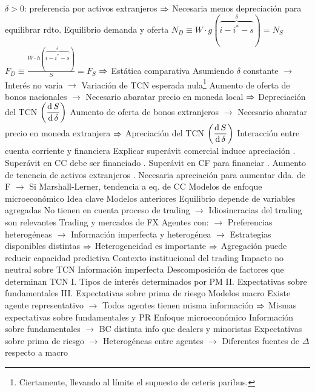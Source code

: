 \documentclass{nuevotema}
\begin{document}
\begin{esquemal}
				\4[] $\delta > 0$: preferencia por activos extranjeros
				\4[] $\Rightarrow$ Necesaria menos depreciación para equilibrar rdto.
				\4 Equilibrio demanda y oferta
				\4[] $N_D \equiv W\cdot g(\overbrace{i - i^* - \dot{s}}^{\delta}) = N_S$
				\4[] $F_D \equiv \frac{W\cdot h(\overbrace{i -i^* -\dot{s}}^\delta)}{S} = F_S$
				\4[] $\Rightarrow$ 
				\4 Estática comparativa
				\4[] Asumiendo $\delta$ constante
				\4[] $\to$ Interés no varía
				\4[] $\to$ Variación de TCN esperada nula\footnote{Ciertamente, llevando al límite el supuesto de ceteris paribus.}
				\4[] Aumento de oferta de bonos nacionales
				\4[] $\to$ Necesario abaratar precio en moneda local
				\4[] $\Rightarrow$ Depreciación del TCN $ \left( \dfrac{\text{d} \, S}{\text{d} \, \delta} \right)$
				\4[] Aumento de oferta de bonos extranjeros
				\4[] $\to$ Necesario abaratar precio en moneda extranjera
				\4[] $\Rightarrow$ Apreciación del TCN $\left( \dfrac{\text{d} \, S}{\text{d} \, \delta} \right)$
				\4 Interacción entre cuenta corriente y financiera
				\4[] Explicar superávit comercial induce apreciación
				. Superávit en CC debe ser financiado
				. Superávit en CF para financiar
				. Aumento de tenencia de activos extranjeros
				. Necesaria apreciación para aumentar dda. de F
				\4[] $\to$ Si Marshall-Lerner, tendencia a eq. de CC
		\2 Modelos de enfoque microeconómico
			\3 Idea clave
				\4 Modelos anteriores
				\4[] Equilibrio depende de variables agregadas
				\4[] No tienen en cuenta proceso de trading
				\4[] $\to$ Idiosincracias del trading son relevantes
				\4 Trading y mercados de FX
				\4[] Agentes con:
				\4[] $\to$ Preferencias heterogéneas
				\4[] $\to$ Información imperfecta y heterogénea
				\4[] $\to$ Estrategias disponibles distintas
				\4[] $\Rightarrow$ Heterogeneidad es importante
				\4[] $\Rightarrow$ Agregación puede reducir capacidad predictiva
				\4 Contexto institucional del trading
				\4[] Impacto no neutral sobre TCN
			\3 Información imperfecta
				\4 Descomposición de factores que determinan TCN
				\4[] I. Tipos de interés determinados por PM
				\4[] II. Expectativas sobre fundamentales
				\4[] III. Expectativas sobre prima de riesgo
				\4 Modelos macro
				\4[] Existe agente representativo
				\4[] $\to$ Todos agentes tienen misma información
				\4[] $\Rightarrow$ Mismas expectativas sobre fundamentales y PR
				\4 Enfoque microeconómico
				\4[] Información sobre fundamentales
				\4[] $\to$ BC distinta info que dealers y minoristas
				\4[] Expectativas sobre prima de riesgo
				\4[] $\to$ Heterogéneas entre agentes
				\4[] $\to$ Diferentes fuentes de $\Delta$ respecto a macro

\end{esquemal}
\end{document}
